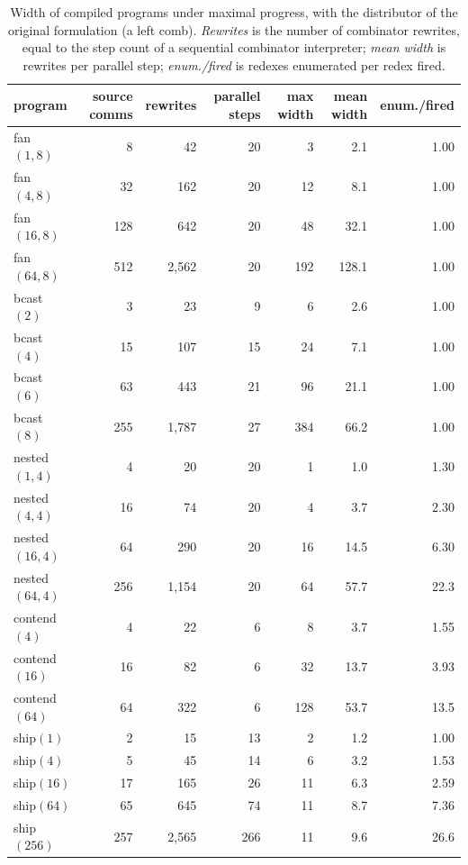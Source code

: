 \documentclass[acmsmall,screen,review,anonymous]{acmart}
\begin{document}
\begin{table}[t]
\small
\begin{tabular}{@{}lrrrrrr@{}}
\toprule
program & source comms & rewrites & parallel steps & max width & mean width & enum./fired\\
\midrule
fan$(1,8)$    &   8 &    42 & 20 &   3 &   2.1 & 1.00\\
fan$(4,8)$    &  32 &   162 & 20 &  12 &   8.1 & 1.00\\
fan$(16,8)$   & 128 &   642 & 20 &  48 &  32.1 & 1.00\\
fan$(64,8)$   & 512 & 2{,}562 & 20 & 192 & 128.1 & 1.00\\
\midrule
bcast$(2)$    &   3 &    23 &  9 &   6 &   2.6 & 1.00\\
bcast$(4)$    &  15 &   107 & 15 &  24 &   7.1 & 1.00\\
bcast$(6)$    &  63 &   443 & 21 &  96 &  21.1 & 1.00\\
bcast$(8)$    & 255 & 1{,}787 & 27 & 384 &  66.2 & 1.00\\
\midrule
nested$(1,4)$  &   4 &    20 & 20 &   1 &   1.0 & 1.30\\
nested$(4,4)$  &  16 &    74 & 20 &   4 &   3.7 & 2.30\\
nested$(16,4)$ &  64 &   290 & 20 &  16 &  14.5 & 6.30\\
nested$(64,4)$ & 256 & 1{,}154 & 20 &  64 &  57.7 & 22.3\\
\midrule
contend$(4)$  &   4 &    22 &  6 &   8 &   3.7 & 1.55\\
contend$(16)$ &  16 &    82 &  6 &  32 &  13.7 & 3.93\\
contend$(64)$ &  64 &   322 &  6 & 128 &  53.7 & 13.5\\
\midrule
ship$(1)$     &   2 &    15 & 13 &   2 &   1.2 & 1.00\\
ship$(4)$     &   5 &    45 & 14 &   6 &   3.2 & 1.53\\
ship$(16)$    &  17 &   165 & 26 &  11 &   6.3 & 2.59\\
ship$(64)$    &  65 &   645 & 74 &  11 &   8.7 & 7.36\\
ship$(256)$   & 257 & 2{,}565 & 266 & 11 &  9.6 & 26.6\\
\bottomrule
\end{tabular}
\caption{Width of compiled programs under maximal progress, with the
distributor of the original formulation (a left comb). \emph{Rewrites} is
the number of combinator rewrites, equal to the step count of a sequential
combinator interpreter; \emph{mean width} is rewrites per parallel step;
\emph{enum./fired} is redexes enumerated per redex fired.}
\label{tab:width}
\end{table}
\end{document}
